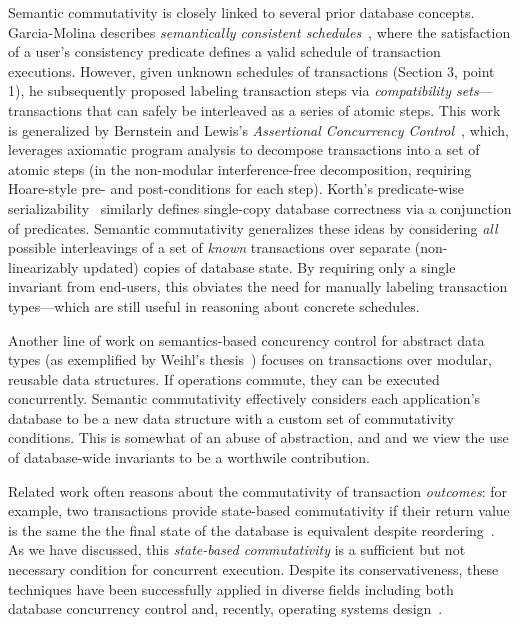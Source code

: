 Semantic commutativity is closely linked to several prior database
concepts. Garcia-Molina describes \textit{semantically consistent
  schedules}~\cite{garciamolina-semantics}, where the satisfaction of
a user's consistency predicate defines a valid schedule of transaction
executions. However, given unknown schedules of transactions (Section
3, point 1), he subsequently proposed labeling transaction steps via
\textit{compatibility sets}---transactions that can safely be
interleaved as a series of atomic steps. This work is generalized by
Bernstein and Lewis's \textit{Assertional Concurrency
  Control}~\cite{decomp-semantics}, which, leverages axiomatic program
analysis to decompose transactions into a set of atomic steps (in the
non-modular interference-free decomposition, requiring Hoare-style
pre- and post-conditions for each step). Korth's predicate-wise
serializability~\cite{korth-serializability} similarly defines
single-copy database correctness via a conjunction of
predicates. Semantic commutativity generalizes these ideas by
considering \textit{all} possible interleavings of a set of
\textit{known} transactions over separate (non-linearizably updated)
copies of database state. By requiring only a single invariant from
end-users, this obviates the need for manually labeling transaction
types---which are still useful in reasoning about concrete schedules.

Another line of work on semantics-based concurency control for
abstract data types (as exemplified by Weihl's
thesis~\cite{weihl-thesis}) focuses on transactions over modular,
reusable data structures. If operations commute, they can be executed
concurrently. Semantic commutativity effectively considers each
application's database to be a new data structure with a custom set of
commutativity conditions. This is somewhat of an abuse of abstraction,
and and we view the use of database-wide invariants to be a worthwile
contribution.

 Related work often reasons about
the commutativity of transaction \textit{outcomes}: for example, two
transactions provide state-based commutativity if their return value
is the same the the final state of the database is equivalent despite
reordering~\cite{kohler-commutativity,weihl-thesis}. As we have
discussed, this \textit{state-based commutativity} is a sufficient but
not necessary condition for concurrent execution. Despite its
conservativeness, these techniques have been successfully applied in
diverse fields including both database concurrency control and,
recently, operating systems design~\cite{kohler-commutativity}.

